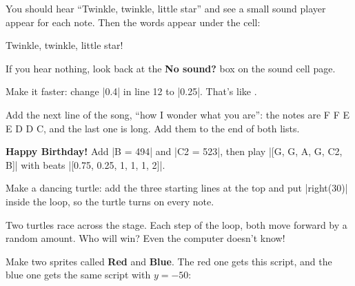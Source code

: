 You should hear ``Twinkle, twinkle, little star'' and see a small sound player appear for each note. Then the words appear under the cell:

\begin{outputbox}
Twinkle, twinkle, little star!
\end{outputbox}

If you hear nothing, look back at the \textbf{No sound?} box on the sound cell page.

\begin{challenge}
\tick Make it faster: change \py|0.4| in line 12 to \py|0.25|. That's like .\par
\tick Add the next line of the song, ``how I wonder what you are'': the notes are F F E E D D C, and the last one is long. Add them to the end of both lists.\par
\tick \textbf{Happy Birthday!} Add \py|B = 494| and \py|C2 = 523|, then play \py|[G, G, A, G, C2, B]| with beats \py|[0.75, 0.25, 1, 1, 1, 2]|.\par
\tick Make a dancing turtle: add the three starting lines at the top and put \py|right(30)| inside the loop, so the turtle turns on every note.
\end{challenge}


Two turtles race across the stage. Each step of the loop, both move forward by a random amount. Who will win? Even the computer doesn't know!

Make two sprites called \textbf{Red} and \textbf{Blue}. The red one gets this script, and the blue one gets the same script with $y = -50$:

\begin{center}
\begin{scratch}
\end{scratch}
\end{center}


